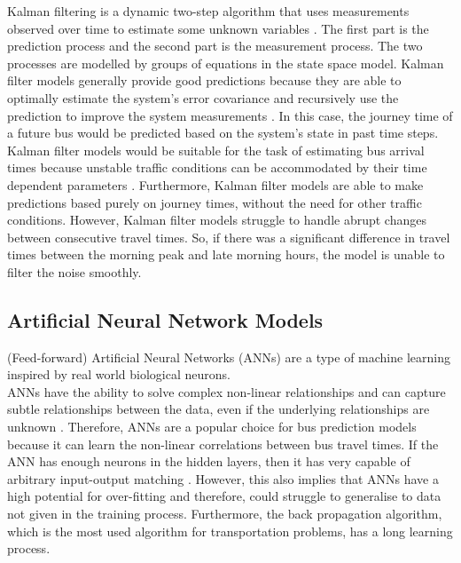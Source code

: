 Kalman filtering is a dynamic two-step algorithm that uses measurements observed over time to estimate some unknown variables \cite{kalman-korean}. The first part is the prediction process and the second part is the measurement process. The two processes are modelled by groups of equations in the state space model. Kalman filter models generally provide good predictions because they are able to optimally estimate the system's error covariance and recursively use the prediction to improve the system measurements \cite{kalman-malay}. In this case, the journey time of a future bus would be predicted based on the system's state in past time steps. \\

Kalman filter models would be suitable for the task of estimating bus arrival times because unstable traffic conditions can be accommodated by their time dependent parameters \cite{dynamic-gps}. Furthermore, Kalman filter models are able to make predictions based purely on journey times, without the need for other traffic conditions. However, Kalman filter models struggle to handle abrupt changes between consecutive travel times. So, if there was a significant difference in travel times between the morning peak and late morning hours, the model is unable to filter the noise smoothly. \\

\subsection{Artificial Neural Network Models}
\label{section:ml-models-research}

(Feed-forward) Artificial Neural Networks (ANNs) are a type of machine learning inspired by real world biological neurons. \\

ANNs have the ability to solve complex non-linear relationships and can capture subtle relationships between the data, even if the underlying relationships are unknown \cite{dynamic-gps}. Therefore, ANNs are a popular choice for bus prediction models because it can learn the non-linear correlations between bus travel times. If the ANN has enough neurons in the hidden layers, then it has very capable of arbitrary input-output matching \cite{intelligent-transport-systems}. However, this also implies that ANNs have a high potential for over-fitting and therefore, could struggle to generalise to data not given in the training process. Furthermore, the back propagation algorithm, which is the most used algorithm for transportation problems, has a long learning process. 

